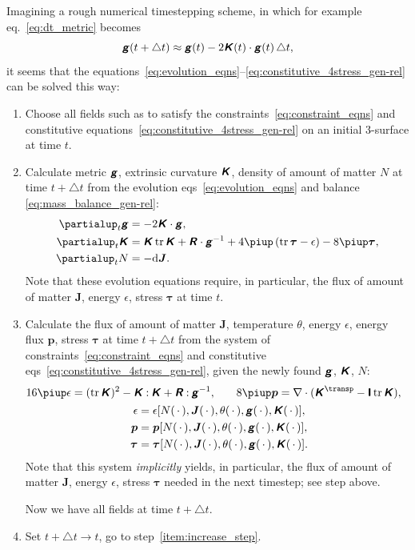 \documentclass[\ifafour a4paper,12pt,\else a5paper,10pt,\fi%
onecolumn,oneside,article,%
british%
]{memoir}
\theoremstyle{remark}
\theoremstyle{innote}
\newcommand*{\mathte}[1]{\textbf{\textit{\textsf{#1}}}}
\newcommand*{\de}{\partialup}%
\newcommand*{\pu}{\piup}%
\newcommand*{\di}{\mathrm{d}}%
\DeclareMathOperator{\tr}{tr}%
\newcommand*{\incr}{\triangle}%
\newcommand*{\dotv}{\mathord{\,\cdot\,}}%
\newcommand*{\con}{\mathbin{:}}%
\renewcommand*{\|}[1][]{\nonscript\,#1\vert\nonscript\;\mathopen{}}
\newcommand*{\eqn}{eq.}%
\newcommand*{\eqns}{eqs}%
\newcommand*{\T}{^\transp}%
\newcommand*{\yd}{N}
\newcommand*{\yjj}{J}
\newcommand*{\yj}{\bm{\yjj}}
\newcommand*{\yTT}{\tau}
\newcommand*{\yT}{\bm{\yTT}}
\newcommand*{\ygg}{g}
\newcommand*{\yg}{\mathte{\ygg}}
\newcommand*{\yKK}{K}
\newcommand*{\yK}{\mathte{\yKK}}
\newcommand*{\yRR}{R}
\newcommand*{\yR}{\mathte{\yRR}}
\newcommand*{\ypp}{p}
\newcommand*{\yp}{\bm{\ypp}}
\newcommand*{\ye}{\epsilon}
\newcommand*{\yte}{\theta}
\newcommand*{\ynab}{\nabla}
\newcommand*{\yto}{t}
\newcommand*{\yI}{\textsf{\textbf{I}}}
\begin{document}
Imagining a rough numerical timestepping scheme, in which for example
\eqn~\eqref{eq:dt_metric} becomes
\begin{equation}
  \label{eq:approx_timestepping_dt_metric}
  \yg(t + \incr t) \approx \yg(t) -2\yK(t)\cdot\yg(t)\,\incr t,
\end{equation}
it seems that the
equations~\eqref{eq:evolution_eqns}--\eqref{eq:constitutive_4stress_gen-rel}
can be solved this way:
\begin{enumerate}[leftmargin=1.5\parindent]
\item Choose all fields such as to satisfy the
  constraints~\eqref{eq:constraint_eqns} and constitutive
  equations~\eqref{eq:constitutive_4stress_gen-rel} on an initial 3-surface
  at time $\yto$.
\item\label{item:increase_step}Calculate metric $\yg$, extrinsic curvature
  $\yK$, density of amount of matter $\yd$ at time $\yto + \incr t$ from
  the evolution \eqns~\eqref{eq:evolution_eqns} and balance
  \eqref{eq:mass_balance_gen-rel}:
  \begin{align*}
    \de_t \yg &= -2\yK\cdot\yg,
    \\
    \de_t \yK &=  \yK\tr\yK + \yR\cdot\yg^{-1} + 4\pu\,(\tr\yT-\ye) - 8\pu\yT,
    \\
    \de_t\yd &= - \di\yj.
  \end{align*}
  Note that these evolution equations require, in particular, the flux of
  amount of matter $\yj$, energy $\ye$, stress $\yT$ at time $\yto$.
\item\label{item:increase_step_energy}Calculate the  flux of amount of matter $\yj$,
  temperature $\yte$, energy $\ye$, energy flux $\yp$, stress $\yT$ at time
  $\yto + \incr t$ from the system of
  constraints~\eqref{eq:constraint_eqns} and constitutive
  \eqns~\eqref{eq:constitutive_4stress_gen-rel}, given the newly found
  $\yg$, $\yK$, $\yd$:
  \begin{gather*}
    \begin{aligned}
    16\pu\ye &= (\tr\yK)^2 - \yK\con\yK + \yR\con\yg^{-1},
    &\quad
      8\pu\yp &= \ynab\cdot(\yK\T - \yI\tr\yK),
    \end{aligned}\\
    \ye = \ye[\yd(\dotv),\yj(\dotv),\yte(\dotv),\yg(\dotv), \yK(\dotv)],
    \\
      \yp = \yp[\yd(\dotv),\yj(\dotv),\yte(\dotv),\yg(\dotv), \yK(\dotv)],
      \\
      \yT = \yT[\yd(\dotv),\yj(\dotv),\yte(\dotv),\yg(\dotv), \yK(\dotv)].
  \end{gather*}
  Note that this system \emph{implicitly} yields, in particular, the flux
  of amount of matter $\yj$, energy $\ye$, stress $\yT$ needed in the next
  timestep; see step above.

  Now we have all fields at time $\yto + \incr t$.

\item Set $\yto + \incr t \to \yto$, go to step~\ref{item:increase_step}.
\end{enumerate}
\end{document}
